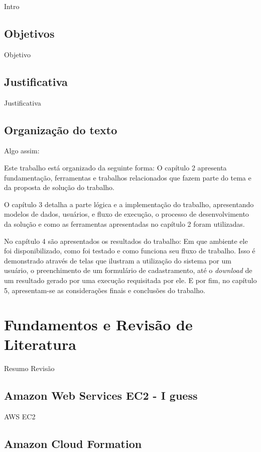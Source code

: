 \documentclass[tg]{mdtufsm}
\begin{document}
Intro

\section{Objetivos}

Objetivo

\section{Justificativa}

Justificativa


\section{Organização do texto}
Algo assim:

Este trabalho está organizado da seguinte forma: O capítulo 2 apresenta fundamentação, ferramentas e trabalhos relacionados que fazem parte do tema e da proposta de solução do trabalho.

O capítulo 3 detalha a parte lógica e a implementação do trabalho, apresentando modelos de dados, usuários, e fluxo de execução, o processo de desenvolvimento da solução e como as ferramentas apresentadas no capítulo 2 foram utilizadas.

No capítulo 4 são apresentados os resultados do trabalho: Em que ambiente ele foi disponibilizado, como foi testado e como funciona seu fluxo de trabalho. Isso é demonstrado através de telas que ilustram a utilização do sistema por um usuário, o preenchimento de um formulário de cadastramento, até o \emph{download} de um resultado gerado por uma execução requisitada por ele. E por fim, no capítulo 5, apresentam-se as considerações finais e conclusões do trabalho.

\chapter{Fundamentos e Revisão de Literatura}

Resumo Revisão

\section{Amazon Web Services EC2 - I guess}

AWS EC2

\section{Amazon Cloud Formation}
\end{document}
